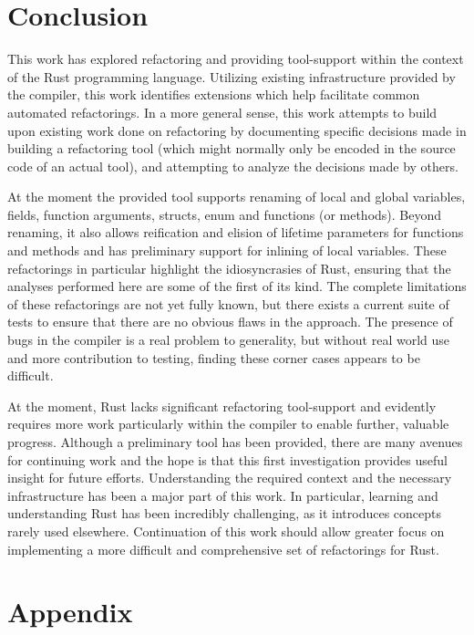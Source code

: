 \chapter{Conclusion}\label{C:con}
This work has explored refactoring and providing tool-support within the context of the Rust programming language. Utilizing existing infrastructure provided by the compiler, this work identifies extensions which help facilitate common automated refactorings. In a more general sense, this work attempts to build upon existing work done on refactoring by documenting specific decisions made in building a refactoring tool (which might normally only be encoded in the source code of an actual tool), and attempting to analyze the decisions made by others.


At the moment the provided tool supports renaming of local and global variables, fields, function arguments, structs, enum and functions (or methods). Beyond renaming, it also allows reification and elision of lifetime parameters for functions and methods and has preliminary support for inlining of local variables. These refactorings in particular highlight the idiosyncrasies of Rust, ensuring that the analyses performed here are some of the first of its kind. The complete limitations of these refactorings are not yet fully known, but there exists a current suite of tests to ensure that there are no obvious flaws in the approach. The presence of bugs in the compiler is a real problem to generality, but without real world use and more contribution to testing, finding these corner cases appears to be difficult.

At the moment, Rust lacks significant refactoring tool-support and evidently requires more work particularly within the compiler to enable further, valuable progress. Although a preliminary tool has been provided, there are many avenues for continuing work and the hope is that this first investigation provides useful insight for future efforts. Understanding the required context and the necessary infrastructure has been a major part of this work. In particular, learning and understanding Rust has been incredibly challenging, as it introduces concepts rarely used elsewhere. Continuation of this work should allow greater focus on implementing a more difficult and comprehensive set of refactorings for Rust.

\chapter{Appendix}\label{C:appen}
